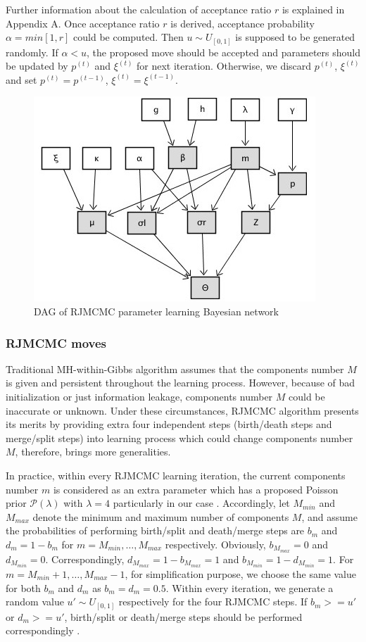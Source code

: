 \documentclass[conference]{IEEEtran}
\begin{document}
Further information about the calculation of acceptance ratio
$r$ is explained in Appendix A. Once acceptance ratio $r$ is derived, acceptance probability $\alpha = min[1,r]$ \cite{Luengo2013} could be computed. Then $u \sim U_{[0,1]}$ is supposed to be generated randomly. If $\alpha < u$, the proposed move should be accepted and parameters should be updated by $p^{(t)}$ and $\xi^{(t)}$ for next iteration. Otherwise, we discard $p^{(t)}$, $\xi^{(t)}$ and set $p^{(t)} = p^{(t-1)}$, $\xi^{(t)} = \xi^{(t-1)}$. 
\bigskip

\begin{figure}[b]
\centering
\includegraphics[width=0.4\paperwidth]{DAG_RJMCMC.jpg}
\caption{DAG of RJMCMC parameter learning Bayesian network}
\label{fig:1}
\end{figure}

\subsubsection*{RJMCMC moves}
Traditional MH-within-Gibbs algorithm assumes that the components number $M$ is given and persistent throughout the learning process. However, because of bad initialization or just information leakage, components number $M$ could be inaccurate or unknown. Under these circumstances, RJMCMC algorithm presents its merits by providing extra four independent steps (birth/death steps and merge/split steps) into learning process which could change components number $M$, therefore, brings more generalities. 

In practice, within every RJMCMC learning iteration, the current components number $m$ is considered as an extra parameter which has a proposed Poisson prior $\mathcal{P}(\lambda)$ with $\lambda = 4$ particularly in our case \cite{Richardson1997}. Accordingly, let $M_{min}$ and $M_{max}$ denote the minimum and maximum number of components $M$, and assume the probabilities of performing birth/split and death/merge steps are $b_m$ and $d_m = 1 - b_m$ for $m = M_{min},\dots,M_{max}$ respectively. Obviously, $b_{M_{max}}=0$ and $d_{M_{min}}=0$. Correspondingly, $d_{M_{max}}=1-b_{M_{max}} = 1$ and $b_{M_{min}}=1-d_{M_{min}}=1$. For $m=M_{min}+1,\dots,M_{max}-1$, for simplification purpose, we choose the same value for both $b_m$ and $d_m$ as $b_m=d_m=0.5$. Within every iteration, we generate a random value $u' \sim U_{[0,1]}$ respectively for the four RJMCMC steps. If $b_m >= u'$ or $d_m >= u'$, birth/split or death/merge steps should be performed correspondingly \cite{Richardson1997}.
\end{document}

